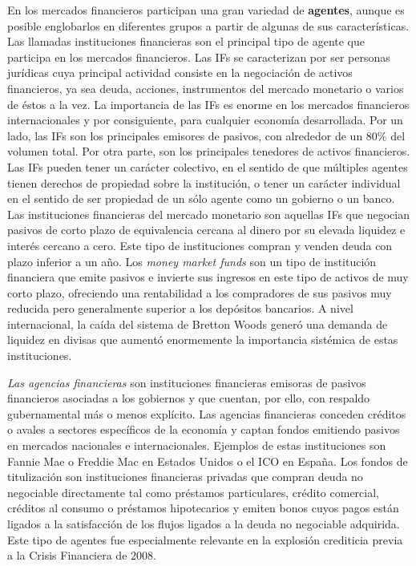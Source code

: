 \documentclass{nuevotema}
\begin{document}
En los mercados financieros participan una gran variedad de \textbf{agentes}, aunque es posible englobarlos en diferentes grupos a partir de algunas de sus características. Las llamadas instituciones financieras son el principal tipo de agente que participa en los mercados financieros. Las IFs se caracterizan por ser personas jurídicas cuya principal actividad consiste en la negociación de activos financieros, ya sea deuda, acciones, instrumentos del mercado monetario o varios de éstos a la vez. La importancia de las IFs es enorme en los mercados financieros internacionales y por consiguiente, para cualquier economía desarrollada. Por un lado, las IFs son los principales emisores de pasivos, con alrededor de un 80\% del volumen total. Por otra parte, son los principales tenedores de activos financieros. Las IFs pueden tener un carácter colectivo, en el sentido de que múltiples agentes tienen derechos de propiedad sobre la institución, o tener un carácter individual en el sentido de ser propiedad de un sólo agente como un gobierno o un banco. Las instituciones financieras del mercado monetario son aquellas IFs que negocian pasivos de corto plazo de equivalencia cercana al dinero por su elevada liquidez e interés cercano a cero. Este tipo de instituciones compran y venden deuda con plazo inferior a un año. Los \textit{money market funds} son un tipo de institución financiera que emite pasivos e invierte sus ingresos en este tipo de activos de muy corto plazo, ofreciendo una rentabilidad a los compradores de sus pasivos muy reducida pero generalmente superior a los depósitos bancarios. A nivel internacional, la caída del sistema de Bretton Woods generó una demanda de liquidez en divisas que aumentó enormemente la importancia sistémica de estas instituciones. 

\textit{Las agencias financieras} son instituciones financieras emisoras de pasivos financieros asociadas a los gobiernos y que cuentan, por ello, con respaldo gubernamental más o menos explícito. Las agencias financieras conceden créditos o avales a sectores específicos de la economía y captan fondos emitiendo pasivos en mercados nacionales e internacionales. Ejemplos de estas instituciones son Fannie Mae o Freddie Mac en Estados Unidos o el ICO en España. Los fondos de titulización son instituciones financieras privadas que compran deuda no negociable directamente tal como préstamos particulares, crédito comercial, créditos al consumo o préstamos hipotecarios y emiten bonos cuyos pagos están ligados a la satisfacción de los flujos ligados a la deuda no negociable adquirida. Este tipo de agentes fue especialmente relevante en la explosión crediticia previa a la Crisis Financiera de 2008. 
\end{document}
